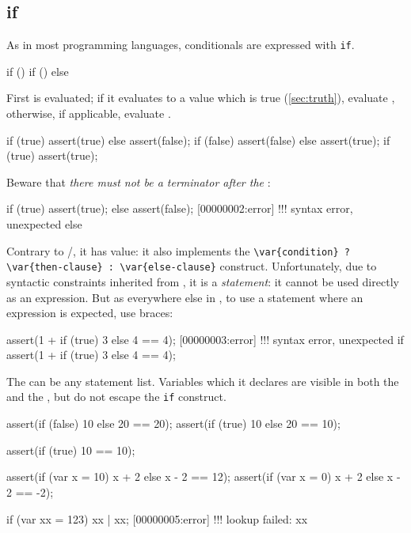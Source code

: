 \subsection{if}
\label{sec:lang:if}
As in most programming languages, conditionals are expressed with
\lstinline|if|.

\begin{urbiunchecked}[frame=, backgroundcolor=, ]
if () 
if ()  else 
\end{urbiunchecked}

First  is evaluated; if it evaluates to a value which
is true (\autoref{sec:truth}), evaluate , otherwise,
if applicable, evaluate .

\begin{urbiscript}[firstnumber=last]
if (true) assert(true) else assert(false);
if (false) assert(false) else assert(true);
if (true) assert(true);
\end{urbiscript}

Beware that \emph{there must not be a terminator after the
  }:

\begin{urbiscript}[firstnumber=last]
if (true)
  assert(true);
else
  assert(false);
[00000002:error] !!! syntax error, unexpected else
\end{urbiscript}

Contrary to \C/\Cxx, it has value: it also implements the
\lstinline|\var{condition} ? \var{then-clause} : \var{else-clause}|
construct.  Unfortunately, due to syntactic constraints inherited from
\C, it is a \emph{statement}: it cannot be used directly as an
expression.  But as everywhere else in \us, to use a statement where
an expression is expected, use braces:

\begin{urbiscript}[firstnumber=last]
assert(1 + if (true) 3 else 4 == 4);
[00000003:error] !!! syntax error, unexpected if
assert(1 + { if (true) 3 else 4 } == 4);
\end{urbiscript}

The  can be any statement list.  Variables which it
declares are visible in both the  and the
, but do not escape the \lstinline|if| construct.

\begin{urbiscript}[firstnumber=last]
assert({if (false) 10 else 20} == 20);
assert({if (true)  10 else 20} == 10);

assert({if (true) 10         } == 10);

assert({if (var x = 10) x + 2 else x - 2} == 12);
assert({if (var x = 0)  x + 2 else x - 2} == -2);

if (var xx = 123) xx | xx;
[00000005:error] !!! lookup failed: xx
\end{urbiscript}

